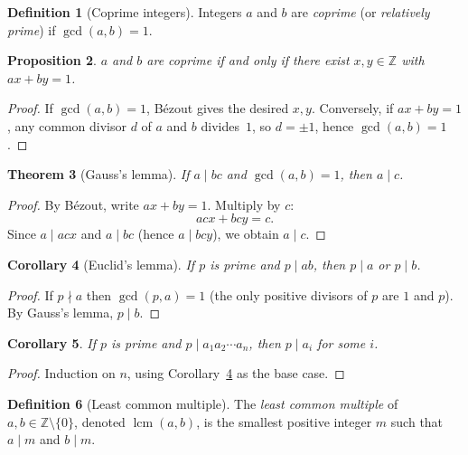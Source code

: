 \documentclass[12pt,a4paper,openany]{book}
\theoremstyle{definition}
\newtheorem{definition}{Definition}[chapter]
\theoremstyle{plain}
\newtheorem{theorem}[definition]{Theorem}
\newtheorem{proposition}[definition]{Proposition}
\newtheorem{corollary}[definition]{Corollary}
\theoremstyle{remark}
\newcommand{\Z}{\mathbb{Z}}
\DeclareMathOperator{\lcm}{lcm}
\begin{document}
\begin{definition}[Coprime integers]
\label{def:coprime}
Integers $a$ and $b$ are \emph{coprime} (or \emph{relatively prime}) if
$\gcd(a,b) = 1$.
\end{definition}

\begin{proposition}
\label{prop:coprime-bezout}
$a$ and $b$ are coprime if and only if there exist $x, y \in \Z$ with
$ax + by = 1$.
\end{proposition}

\begin{proof}
If $\gcd(a,b) = 1$, B\'{e}zout gives the desired $x,y$.
Conversely, if $ax + by = 1$, any common divisor $d$ of $a$ and $b$ divides~$1$,
so $d = \pm 1$, hence $\gcd(a,b) = 1$.
\end{proof}

\begin{theorem}[Gauss's lemma]
\label{thm:gauss-lemma}
If $a \mid bc$ and $\gcd(a,b) = 1$, then $a \mid c$.
\end{theorem}

\begin{proof}
By B\'{e}zout, write $ax + by = 1$. Multiply by $c$:
\[
  acx + bcy = c.
\]
Since $a \mid acx$ and $a \mid bc$ (hence $a \mid bcy$), we obtain $a \mid c$.
\end{proof}

\begin{corollary}[Euclid's lemma]
\label{cor:euclid-lemma}
If $p$ is prime and $p \mid ab$, then $p \mid a$ or $p \mid b$.
\end{corollary}

\begin{proof}
If $p \nmid a$ then $\gcd(p,a) = 1$ (the only positive divisors of $p$ are $1$
and $p$). By Gauss's lemma, $p \mid b$.
\end{proof}

\begin{corollary}
\label{cor:euclid-lemma-general}
If $p$ is prime and $p \mid a_1 a_2 \cdots a_n$, then $p \mid a_i$ for some $i$.
\end{corollary}

\begin{proof}
Induction on $n$, using Corollary~\ref{cor:euclid-lemma} as the base case.
\end{proof}

\begin{definition}[Least common multiple]
\label{def:lcm}
The \emph{least common multiple} of $a,b \in \Z \setminus \{0\}$, denoted
$\lcm(a,b)$, is the smallest positive integer $m$ such that $a \mid m$ and
$b \mid m$.
\end{definition}
\end{document}
